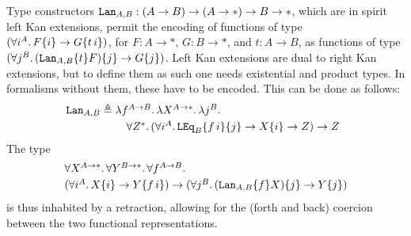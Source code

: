 Type constructors ${\mathtt{Lan}_{A,B}:(A\to B)\to (A\to*)\to B\to *}$, which are
in spirit left Kan extensions, permit the encoding of functions of type
$(\forall i^{A}.\, F\{i\}\to G\{t\,i\})$, for ${F:A\to*}$, ${G:B\to*}$, and
${t:A\to B}$, as functions of type $(\forall j^{B}.\, (\mathtt{Lan}_{A,B}\{t\} F)\{j\}\to G\{j\})$.  Left Kan extensions are dual to right Kan extensions, but
to define them as such one needs existential and product types.  In
formalisms without them, these have to be encoded.  This can be done as
follows: 
\[
\mathtt{Lan}_{A,B}
\triangleq
\!\!\!
\begin{array}[t]{l}
\lambda f^{A\to B}.\,
\lambda X^{A\to*}.\,
\lambda j^{B}.\, 
\\[1mm]
\quad
\forall Z^{*}.\,
  (\forall i^A.\, \mathtt{LEq}_B\{f\,i\}\{j\}\to X\{i\}\to Z)\to Z
\end{array}
\]
The type 
\[\begin{array}{l}
\forall X^{A\to*}.\,
\forall Y^{B\to*}.\,
\forall f^{A\to B}.\,
\\[1mm]
(\forall i^{A}.\, 
X\{i\}\to Y\{f\,i\})
\to
(\forall j^{B}.\, 
(\mathtt{Lan}_{A,B}\{f\} X)\{j\}\to Y\{j\})
\end{array}\]
is thus inhabited by a retraction, allowing for the (forth and back)
coercion between the two functional representations.


